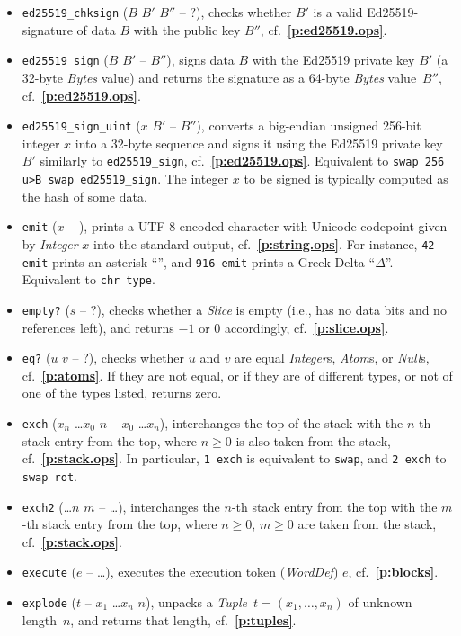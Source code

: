 \documentclass[12pt,oneside]{article}
\def\refpoint#1{{\rm\textbf{\ref{#1}}}}
\let\ptref=\refpoint
\begin{document}
\begin{itemize}
\item {\tt ed25519\_chksign} ($B$ $B'$ $B''$ -- $?$), checks whether $B'$ is a valid Ed25519-signature of data $B$ with the public key $B''$, cf.~\ptref{p:ed25519.ops}.
\item {\tt ed25519\_sign} ($B$ $B'$ -- $B''$), signs data $B$ with the Ed25519 private key $B'$ (a 32-byte {\em Bytes\/} value) and returns the signature as a 64-byte {\em Bytes\/} value~$B''$, cf.~\ptref{p:ed25519.ops}.
\item {\tt ed25519\_sign\_uint} ($x$ $B'$ -- $B''$), converts a big-endian unsigned 256-bit integer $x$ into a 32-byte sequence and signs it using the Ed25519 private key $B'$ similarly to {\tt ed25519\_sign}, cf.~\ptref{p:ed25519.ops}. Equivalent to {\tt swap 256 u>B swap ed25519\_sign}. The integer $x$ to be signed is typically computed as the hash of some data.
\item {\tt emit} ($x$ -- ), prints a UTF-8 encoded character with Unicode codepoint given by {\em Integer\/} $x$ into the standard output, cf.~\ptref{p:string.ops}. For instance, {\tt 42 emit} prints an asterisk ``{\tt *}'', and {\tt 916 emit} prints a Greek Delta ``{\tt $\Delta$}''. Equivalent to {\tt chr type}.
\item {\tt empty?} ($s$ -- $?$), checks whether a {\em Slice\/} is empty (i.e., has no data bits and no references left), and returns $-1$ or $0$ accordingly, cf.~\ptref{p:slice.ops}.
\item {\tt eq?} ($u$ $v$ -- $?$), checks whether $u$ and $v$ are equal {\em Integer\/}s, {\em Atom\/}s, or {\em Null\/}s, cf.~\ptref{p:atoms}. If they are not equal, or if they are of different types, or not of one of the types listed, returns zero.
\item {\tt exch} ($x_n$ \dots $x_0$ $n$ -- $x_0$ \dots $x_n$), interchanges the top of the stack with the $n$-th stack entry from the top, where $n\geq0$ is also taken from the stack, cf.~\ptref{p:stack.ops}. In particular, {\tt 1 exch} is equivalent to {\tt swap}, and {\tt 2 exch} to {\tt swap rot}.
\item {\tt exch2} (\dots $n$ $m$ -- \dots), interchanges the $n$-th stack entry from the top with the $m$-th stack entry from the top, where $n\geq0$, $m\geq0$ are taken from the stack, cf.~\ptref{p:stack.ops}.
\item {\tt execute} ($e$ -- \dots), executes the execution token ({\em WordDef\/}) $e$, cf.~\ptref{p:blocks}.
\item {\tt explode} ($t$ -- $x_1$ \dots $x_n$ $n$), unpacks a {\em Tuple\/}~$t=(x_1,\ldots,x_n)$ of unknown length~$n$, and returns that length, cf.~\ptref{p:tuples}.

\end{itemize}
\end{document}
